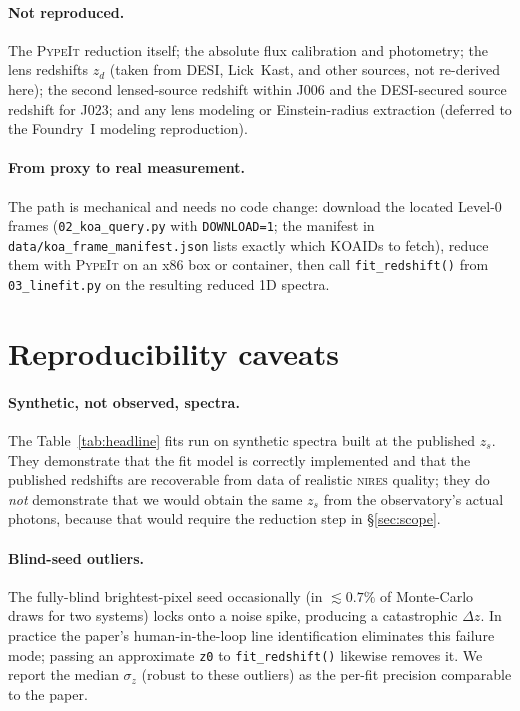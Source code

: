 \documentclass[11pt,letterpaper]{article}
\newcommand{\zs}{\ensuremath{z_s}}
\newcommand{\zd}{\ensuremath{z_d}}
\newcommand{\dz}{\ensuremath{\Delta z}}
\newcommand{\NIRES}{\textsc{nires}}
\begin{document}
\paragraph{Not reproduced.} The \textsc{PypeIt} reduction itself; the
absolute flux calibration and photometry; the lens redshifts \zd{} (taken
from DESI, Lick~Kast, and other sources, not re-derived here); the second
lensed-source redshift within J006 and the DESI-secured source redshift
for J023; and any lens modeling or Einstein-radius extraction (deferred to
the Foundry~I modeling reproduction).

\paragraph{From proxy to real measurement.} The path is mechanical and
needs no code change: download the located Level-0 frames
(\texttt{02\_koa\_query.py} with \texttt{DOWNLOAD=1}; the manifest in
\texttt{data/koa\_frame\_manifest.json} lists exactly which KOAIDs to
fetch), reduce them with \textsc{PypeIt} on an x86 box or container, then
call \texttt{fit\_redshift()} from \texttt{03\_linefit.py} on the
resulting reduced 1D spectra.

\section{Reproducibility caveats}

\paragraph{Synthetic, not observed, spectra.} The
Table~\ref{tab:headline} fits run on synthetic spectra built at the
published \zs. They demonstrate that the fit model is correctly
implemented and that the published redshifts are recoverable from data of
realistic \NIRES{} quality; they do \emph{not} demonstrate that we would
obtain the same \zs{} from the observatory's actual photons, because that
would require the reduction step in \S\ref{sec:scope}.

\paragraph{Blind-seed outliers.} The fully-blind brightest-pixel seed
occasionally (in $\lesssim0.7\%$ of Monte-Carlo draws for two systems)
locks onto a noise spike, producing a catastrophic \dz. In practice the
paper's human-in-the-loop line identification eliminates this failure
mode; passing an approximate \texttt{z0} to \texttt{fit\_redshift()}
likewise removes it. We report the median $\sigma_z$ (robust to these
outliers) as the per-fit precision comparable to the paper.
\end{document}
